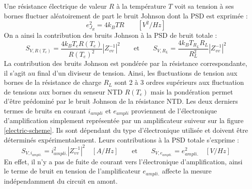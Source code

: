 Une résistance électrique de valeur $R$ à la température $T$ voit sa tension à ses bornes fluctuer aléatoirement de part le bruit Johnson dont la PSD est exprimée :
\begin{equation}
e_{J_R}^2 = 4k_B T R \qquad [V^2/Hz]
\end{equation}
On a ainsi la contribution des bruits Johnson à la PSD de bruit totale :
\begin{equation}
S_{V,R(T_e)} = \frac{4 k_B T_e R(T_e)}{R(T_e)^2} \left\vert Z_{vv}^{-1}\right\vert^2
\qquad \textrm{et} \qquad
S_{V,R_L} = \frac{4 k_B T_{R_L} R_L}{R_L^2} \left\vert Z_{vv}^{-1}\right\vert^2
\end{equation}
La contribution des bruits Johnson est pondérée par la résistance correspondante, il s'agit au final d'un diviseur de tension. Ainsi, les fluctuations de tension aux bornes de la résistance de charge $R_L$ sont 2 à 3 ordres supérieurs aux fluctuation de tensions aux bornes du senseur NTD $R(T_e)$ mais la pondération permet d'être prédominé par le bruit Johnson de la résistance NTD.
Les deux derniers termes de bruits en courant $i_{ampli}$ et $e_{ampli}$ proviennent de l'électronique d'amplification simplement représentée par un amplificateur suiveur sur la figure \ref{electric-scheme}. Ils sont dépendant du type d'électronique utilisée et doivent être déterminés expérimentalement. Leurs contributions à la PSD totale s'exprime :
\begin{equation}
\label{bruit-ampli}
S_{V,i_{ampli.}} = i_{ampli.}^2 \left\vert Z_{vv}^{-1}\right\vert^2 \quad [A/Hz]
\qquad
\textrm{et}
\qquad
S_{V,e_{ampli.}} = e_{ampli.}^2 \quad [V/Hz]
\end{equation}
En effet, il n'y a pas de fuite de courant vers l'électronique d'amplification, ainsi le terme de bruit en tension de l'amplificateur $e_{ampli.}$ affecte la mesure indépendamment du circuit en amont.

